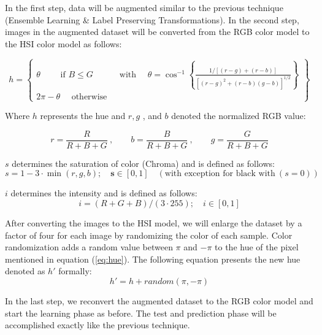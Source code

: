 In the first step, data will be augmented similar to the previous technique (Ensemble Learning \& Label Preserving Transformations). In the second step, images in the augmented dataset will be converted from the RGB color model to the HSI color model \cite{image-processing} as follows:

\begin{equation}
  \label{eq:hue}
  h=\left\{\begin{array}{ll}
    \theta \quad \quad \text { if } B \leq G & \text { with } \quad \theta=\cos ^{-1}\left\{\frac{1 /[(r-g)+(r-b)]}{\left[(r-g)^{2}+(r-b)(g-b)\right]^{1 / 2}}\right\} \\
    2 \pi-\theta \quad \text { otherwise }   &
  \end{array}\right\}
\end{equation}

Where $h$ represents the hue and $r,g$ , and $b$ denoted the normalized RGB value:

\begin{equation}
  r = \frac{R}{R+B+G} \ , \quad \quad b = \frac{B}{R+B+G} \ , \quad \quad g = \frac{G}{R+B+G}
\end{equation}


$s$ determines the saturation of color (Chroma) and is defined as follows:
\begin{equation}
  s=1-3 \cdot \min (r, g, b) ; \quad \mathbf{s} \in[0,1] \quad (\text{with exception for black with} \ (s=0) )
\end{equation}

$i$ determines the intensity and is defined as follows:
\begin{equation}
  i=(R+G+B) /(3 \cdot 255) ; \quad i \in[0,1]
\end{equation}

After converting the images to the HSI model, we will enlarge the dataset by a factor of four for each
image by randomizing the color of each sample. Color randomization adds a
random value between $\pi$ and $- \pi$ to the hue of the pixel mentioned in equation
(\ref{eq:hue}). The following equation presents the new hue denoted as $h'$ formally:
\begin{equation}
  \label{eq:new_hue}
  h'= h + random(\pi, - \pi)
\end{equation}

In the last step, we reconvert the augmented dataset to the RGB color model and start the learning
phase as before. The test and prediction phase will be accomplished exactly like the previous
technique.

